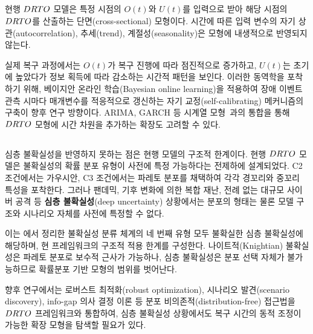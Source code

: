 \subsection{}
\label{subsec:lim-temporal}

현행 $DRTO$ 모델은 특정 시점의 $O(t)$와 $U(t)$를 입력으로 받아
해당 시점의 $DRTO$를 산출하는 단면(cross-sectional) 모형이다.
시간에 따른 입력 변수의 자기 상관(autocorrelation), 추세(trend),
계절성(seasonality)은 모형에 내생적으로 반영되지 않는다.

실제 복구 과정에서는 $O(t)$가 복구 진행에 따라 점진적으로 증가하고,
$U(t)$는 초기에 높았다가 정보 획득에 따라 감소하는 시간적 패턴을 보인다.
이러한 동역학을 포착하기 위해, 베이지안 온라인 학습(Bayesian online learning)을
적용하여 장애 이벤트 관측 시마다 매개변수를 적응적으로 갱신하는
자기 교정(self-calibrating) 메커니즘의 구축이 향후 연구 방향이다.
ARIMA, GARCH 등 시계열 모형~\citep{durbin2012timeseries,hyndman2018forecasting}과의 통합을 통해
$DRTO$ 모형에 시간 차원을 추가하는 확장도 고려할 수 있다.


\subsection{}
\label{subsec:lim-deep-uncertainty}

심층 불확실성을 반영하지 못하는 점은 현행 모델의 구조적 한계이다.
현행 $DRTO$ 모델은 불확실성의 확률 분포 유형이 사전에 특정 가능하다는 전제하에
설계되었다. C2 조건에서는 가우시안, C3 조건에서는 파레토 분포를 채택하여
각각 경꼬리와 중꼬리 특성을 포착한다. 그러나 팬데믹, 기후 변화에 의한 복합 재난,
전례 없는 대규모 사이버 공격 등 \textbf{심층 불확실성}(deep uncertainty) 상황에서는
분포의 형태는 물론 모델 구조와 시나리오 자체를 사전에 특정할 수 없다.

이는 에서 정리한 불확실성 분류 체계의
네 번째 유형\chg{(} 모두 불확실한 심층 불확실성\chg{)}에 해당하며,
현 프레임워크의 구조적 적용 한계를 구성한다.
나이트적(Knightian) 불확실성은 파레토 분포로 보수적 근사가 가능하나,
심층 불확실성은 분포 선택 자체가 불가능하므로 확률분포 기반 모형의 범위를 벗어난다.

향후 연구에서는 로버스트 최적화(robust optimization),
시나리오 발견(scenario discovery),
info-gap 의사 결정 이론 등 분포 비의존적(distribution-free) 접근법을
$DRTO$ 프레임워크와 통합하여,
심층 불확실성 상황에서도 복구 시간의 동적 조정이 가능한 확장 모형을 탐색할 필요가 있다.


